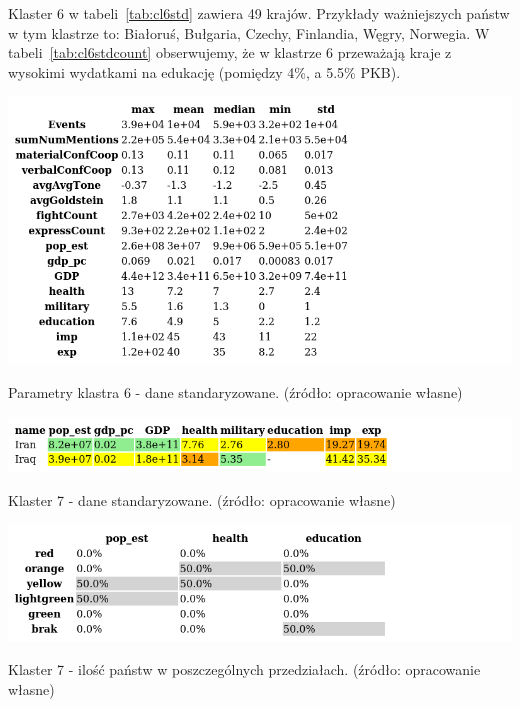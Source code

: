 \documentclass[11pt]{report}
\begin{document}
    Klaster 6 w tabeli~\ref{tab:cl6std} zawiera 49 krajów.
    Przykłady ważniejszych państw w tym klastrze to: Białoruś, Bułgaria, Czechy, Finlandia, Węgry, Norwegia.
    W tabeli~\ref{tab:cl6stdcount} obserwujemy, że w klastrze 6 przeważają kraje z wysokimi wydatkami na edukację (pomiędzy 4\%, a 5.5\% PKB).

    \begin{table}[!htp]
        \centering
        \includegraphics[width=\linewidth]{tables/CLUST/desc/clust6std_desc.png}
        \caption{Parametry klastra 6 - dane standaryzowane. (źródło: opracowanie własne)}
        \label{tab:cl6std_desc}
    \end{table}

    \begin{table}[!htp]
        \centering
        \includegraphics[width=\linewidth]{tables/CLUST/cluster7stdkmeans.png}
        \caption{Klaster 7 - dane standaryzowane. (źródło: opracowanie własne)}
        \label{tab:cl7std}
    \end{table}

    \begin{table}[!htp]
        \centering
        \includegraphics[width=\linewidth]{tables/CLUST/cluster7stdkmeanscount.png}
        \caption{Klaster 7 - ilość państw w poszczególnych przedziałach. (źródło: opracowanie własne)}
        \label{tab:cl7stdcount}
    \end{table}
\end{document}
